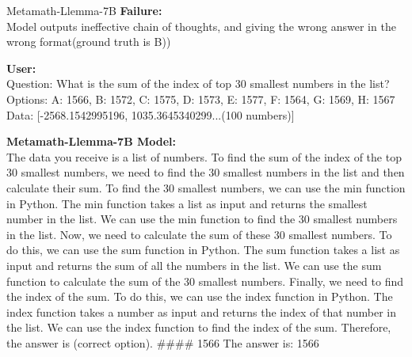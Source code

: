 	\begin{figure*}
		\begin{examplebox}{Metamath-Llemma-7B}
			\textbf{Failure:}\\ Model outputs ineffective chain of thoughts, and giving the wrong answer in the wrong format(ground truth is B))
			
			\vspace{0.2cm}
			\textbf{User:}\\ Question: What is the sum of the index of top 30 smallest numbers in the list? Options: A: 1566, B: 1572, C: 1575, D: 1573, E: 1577, F: 1564, G: 1569, H: 1567 Data: [-2568.1542995196, 1035.3645340299...(100 numbers)]
			
			\vspace{0.3cm}
			\textbf{Metamath-Llemma-7B Model:} \\ The data you receive is a list of numbers. To find the sum of the index of the top 30 smallest numbers, we need to find the 30 smallest numbers in the list and then calculate their sum. To find the 30 smallest numbers, we can use the min function in Python. The min function takes a list as input and returns the smallest number in the list. We can use the min function to find the 30 smallest numbers in the list. Now, we need to calculate the sum of these 30 smallest numbers. To do this, we can use the sum function in Python. The sum function takes a list as input and returns the sum of all the numbers in the list. We can use the sum function to calculate the sum of the 30 smallest numbers. Finally, we need to find the index of the sum. To do this, we can use the index function in Python. The index function takes a number as input and returns the index of that number in the list. We can use the index function to find the index of the sum. Therefore, the answer is (correct option). \#\#\#\# 1566 The answer is: 1566
		\end{examplebox}
		\caption{Failure type and conversation record of Metamath-Llemma-7B. The model attempts to use programming language to solve the problem, but it does not provide executable lines of code, only providing vague description of certain functions instead. After outputting the vague solution, the model outputs an answer, which is different from the ground truth and not in the expected format(We expect the model to provide the answer with a capital letter corresponding to the correct option).}
		\label{fig:fail_llemma}
	\end{figure*}

